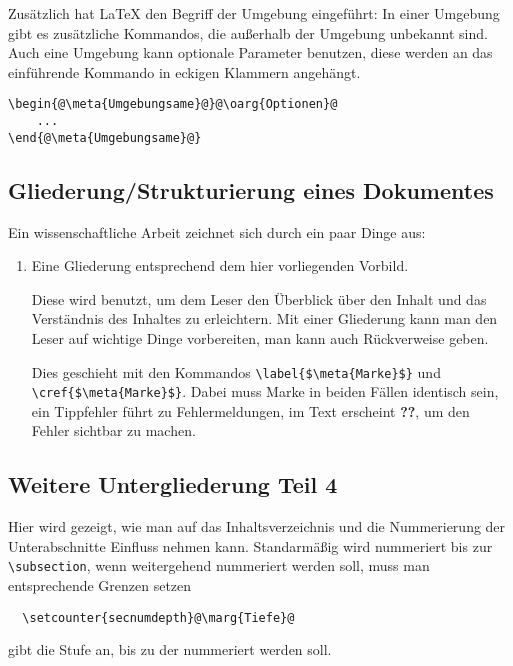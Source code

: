 Zusätzlich hat \LaTeX{} den Begriff der Umgebung eingeführt: In einer
Umgebung gibt es zusätzliche Kommandos, die außerhalb der Umgebung
unbekannt sind. Auch eine Umgebung kann optionale Parameter benutzen, diese
werden an das einführende Kommando in eckigen Klammern angehängt.
\begin{lstlisting}
\begin{@\meta{Umgebungsame}@}@\oarg{Optionen}@
    ...
\end{@\meta{Umgebungsame}@}
\end{lstlisting}


\subsection{Gliederung/Strukturierung eines Dokumentes}

Ein wissenschaftliche Arbeit zeichnet sich durch ein paar Dinge aus:
\begin{enumerate}
  \item Eine Gliederung entsprechend dem hier vorliegenden Vorbild.

    Diese wird benutzt, um dem Leser den Überblick über den Inhalt und
    das Verständnis des Inhaltes zu erleichtern. Mit einer Gliederung
    kann man den Leser auf wichtige Dinge vorbereiten, man kann auch
    Rückverweise geben.

    Dies geschieht mit den Kommandos
    \lstinline[mathescape]|\label{$\meta{Marke}$}| und
    \lstinline[mathescape]|\cref{$\meta{Marke}$}|. Dabei muss Marke in
    beiden Fällen identisch sein, ein Tippfehler führt zu
    Fehlermeldungen, im Text erscheint \textbf{??}, um den Fehler
    sichtbar zu machen.

\end{enumerate}



\subsection{Weitere Untergliederung Teil 4}

Hier wird gezeigt, wie man auf das Inhaltsverzeichnis und die
Nummerierung der Unterabschnitte Einfluss nehmen kann. Standarmäßig
wird nummeriert bis zur \lstinline|\subsection|, wenn weitergehend
nummeriert werden soll, muss man entsprechende Grenzen setzen
\begin{lstlisting}
  \setcounter{secnumdepth}@\marg{Tiefe}@
\end{lstlisting}
 gibt die Stufe an, bis zu der nummeriert werden soll.

